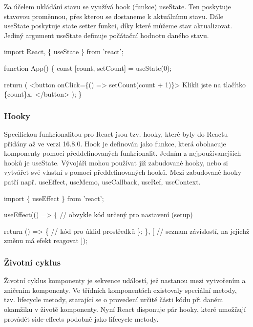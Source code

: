 Za účelem ukládání stavu se využívá hook (funkce) useState. Ten poskytuje stavovou proměnnou, přes kterou se dostaneme k aktuálnímu stavu. 
Dále useState poskytuje state setter funkci, díky které můžeme stav aktualizovat. Jediný argument useState definuje počátační hodnotu daného stavu.\cite{reactitnetwork,react}

\begin{prog}
import React, \{ useState \} from 'react';

function App() \{
  const [count, setCount] = useState(0);

  return (
    <button onClick=\{() => setCount(count + 1)\}>
      Klikli jste na tlačítko \{count\}x.
    </button>
  );
\}
\end{prog}

\subsubsection{Hooky}

Specifickou funkcionalitou pro React jsou tzv. hooky, které byly do Reactu přidány až ve verzi 16.8.0.\cite{reactgithub} 
Hook je definován jako funkce, která obohacuje komponenty pomocí předdefinovaných funkcionalit. Jedním z nejpoužívanejších hooků je useState. 
Vývojáři mohou používat již zabudované hooky, nebo si vytvářet své vlastní s pomocí předdefinovaných hooků. 
Mezi zabudované hooky patří např. useEffect, useMemo, useCallback, useRef, useContext.\cite{react}

\begin{prog}
import \{ useEffect \} from 'react';

useEffect(() => \{
  // obvykle kód určený pro nastavení (setup)

  return () => \{
    // kód pro úklid prostředků
  \};
\}, [
  // seznam závislostí, na jejichž změnu má efekt reagovat
]);
\end{prog}

\subsubsection{Životní cyklus}

Životní cyklus komponenty je sekvence událostí, jež nastanou mezi vytvořením a zničením komponenty. 
Ve třídních komponentách existovaly speciální metody, tzv. lifecycle metody, starající se o provedení určité části kódu při daném okamžiku v životě komponenty. 
Nyní React disponuje pár hooky, které umožňují provádět side-effects podobně jako lifecycle metody.

